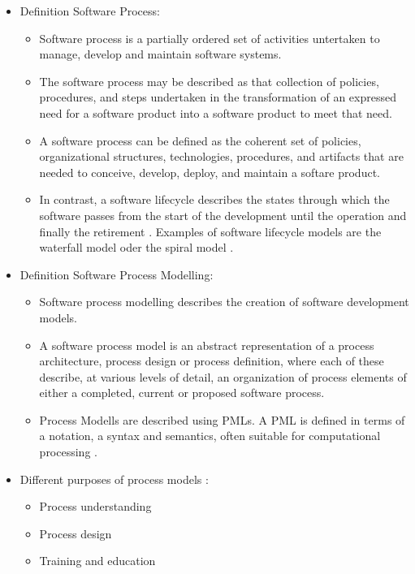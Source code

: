 \begin{itemize}
	\item Definition Software Process: 
	\begin{itemize}
		\item Software process is a partially ordered set of activities untertaken to manage, develop and maintain software systems. \citep{Acuna:2001aa}
		\item The software process may be described as that collection of policies, procedures, and steps undertaken in the transformation of an expressed need for a software product into a software product to meet that need. \citep{McChesney:1995aa}
		\item A software process can be defined as the coherent set of policies, organizational structures, technologies, procedures, and artifacts that are needed to conceive, develop, deploy, and maintain a softare product. \citep{Fuggetta:2000ds}
		\item In contrast, a software lifecycle describes the states through which the software passes from the start of the development until the operation and finally the retirement \citep{Acuna:aa}. Examples of software lifecycle models are the waterfall model \citep{Royce:1987tl} oder the spiral model \citep{Boehm:1988cd}.
	\end{itemize}
	\item Definition Software Process Modelling: 
	\begin{itemize}
		\item Software process modelling describes the creation of software development models. \citep{Acuna:2001aa}
		\item A software process model is an abstract representation  of a process architecture, process design or process definition, where each of these describe, at various levels of detail, an organization of process elements of either a completed, current or proposed software process. \citep{Feiler:1993aa}
		\item Process Modells are described using \acp{PML}. A \ac{PML} is defined in terms of a notation, a syntax and semantics, often suitable for computational processing \citep{Bendraou:2005dv}.
	\end{itemize}
	\item Different purposes of process models \citep{Fuggetta:2000ds}:
	\begin{itemize}
		\item Process understanding
		\item Process design
		\item Training and education

\end{itemize}
\end{itemize}

